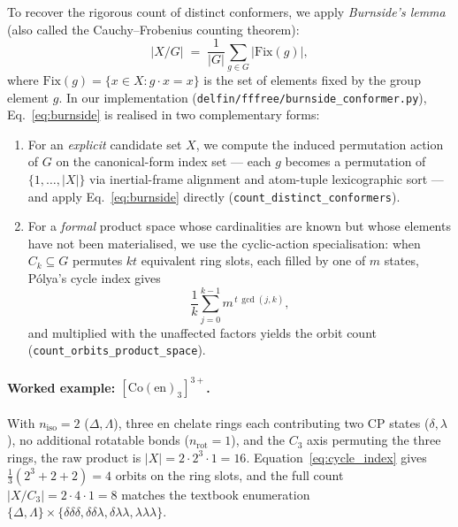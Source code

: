 To recover the rigorous count of distinct conformers, we apply
\emph{Burnside's lemma} (also called the Cauchy--Frobenius
counting theorem):
\begin{equation}
  \lvert X / G \rvert
  \;=\;
  \frac{1}{\lvert G \rvert} \sum_{g \in G} \lvert \mathrm{Fix}(g) \rvert,
  \label{eq:burnside}
\end{equation}
where $\mathrm{Fix}(g) = \{ x \in X : g \cdot x = x\}$ is the set of
elements fixed by the group element $g$.  In our implementation
(\texttt{delfin/fffree/burnside\_conformer.py}), Eq.~\eqref{eq:burnside}
is realised in two complementary forms:
\begin{enumerate}
  \item For an \emph{explicit} candidate set $X$, we compute the
        induced permutation action of $G$ on the canonical-form
        index set --- each $g$ becomes a permutation of $\{1,\dots,
        \lvert X \rvert\}$ via inertial-frame alignment and
        atom-tuple lexicographic sort --- and apply
        Eq.~\eqref{eq:burnside} directly
        (\texttt{count\_distinct\_conformers}).
  \item For a \emph{formal} product space whose cardinalities are
        known but whose elements have not been materialised, we use
        the cyclic-action specialisation: when $C_k \subseteq G$
        permutes $kt$ equivalent ring slots, each filled by one of
        $m$ states, Pólya's cycle index gives
        \begin{equation}
          \frac{1}{k}\sum_{j=0}^{k-1} m^{\,t\,\gcd(j,k)},
          \label{eq:cycle_index}
        \end{equation}
        and multiplied with the unaffected factors yields the orbit
        count (\texttt{count\_orbits\_product\_space}).
\end{enumerate}

\paragraph{Worked example: $[\mathrm{Co(en)}_3]^{3+}$.}
With $n_{\mathrm{iso}} = 2$ ($\Delta, \Lambda$),
three en chelate rings each contributing two CP states
($\delta, \lambda$), no additional rotatable bonds
($n_{\mathrm{rot}} = 1$), and the $C_3$ axis permuting the three
rings, the raw product is $\lvert X \rvert = 2 \cdot 2^3 \cdot 1 = 16$.
Equation~\eqref{eq:cycle_index} gives
$\tfrac{1}{3}\!\left(2^3 + 2 + 2\right) = 4$ orbits on the ring
slots, and the full count
$\lvert X / C_3 \rvert = 2 \cdot 4 \cdot 1 = 8$ matches the textbook
enumeration $\{\Delta, \Lambda\} \times \{\delta\delta\delta,
\delta\delta\lambda, \delta\lambda\lambda, \lambda\lambda\lambda\}$.

